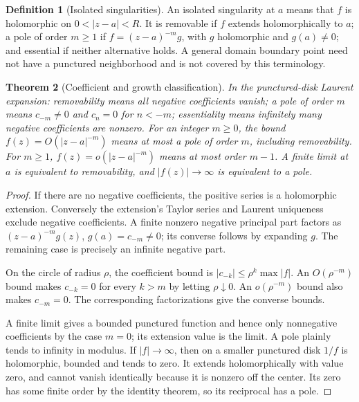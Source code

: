 \documentclass[11pt,a4paper,openany]{book}
\newtheorem{theorem}{Theorem}[chapter]
\theoremstyle{definition}
\newtheorem{definition}[theorem]{Definition}
\theoremstyle{remark}\newtheorem{remark}[theorem]{Remark}
\newcommand{\family}[1]{}
\begin{document}
\begin{definition}[Isolated singularities]\family{D12.07.02}\label{d12:07-02}
An isolated singularity at \(a\) means that \(f\) is holomorphic on
\(0<|z-a|<R\). It is removable if \(f\) extends holomorphically to \(a\);
a pole of order \(m\ge1\) if \(f=(z-a)^{-m}g\), with \(g\) holomorphic
and \(g(a)\ne0\); and essential if neither alternative holds.
A general domain boundary point need not have a punctured neighborhood
and is not covered by this terminology.
\end{definition}
\begin{theorem}[Coefficient and growth classification]\label{d12:07-02-classification}
In the punctured-disk Laurent expansion:
removability means all negative coefficients vanish;
a pole of order \(m\) means \(c_{-m}\ne0\) and \(c_n=0\) for \(n<-m\);
essentiality means infinitely many negative coefficients are nonzero.
For an integer \(m\ge0\), the bound \(f(z)=O(|z-a|^{-m})\) means at
most a pole of order \(m\), including removability.
For \(m\ge1\), \(f(z)=o(|z-a|^{-m})\) means at most order \(m-1\).
A finite limit at \(a\) is equivalent to removability, and
\(|f(z)|\to\infty\) is equivalent to a pole.
\end{theorem}
\begin{proof}
If there are no negative coefficients, the positive series is a
holomorphic extension. Conversely the extension's Taylor series and
Laurent uniqueness exclude negative coefficients.
A finite nonzero negative principal part factors as
\((z-a)^{-m}g(z)\), \(g(a)=c_{-m}\ne0\); its converse follows by
expanding \(g\). The remaining case is precisely an infinite negative
part.

On the circle of radius \(\rho\), the coefficient bound is
\(|c_{-k}|\le\rho^k\max|f|\).
An \(O(\rho^{-m})\) bound makes \(c_{-k}=0\) for every \(k>m\) by
letting \(\rho\downarrow0\). An \(o(\rho^{-m})\) bound also makes
\(c_{-m}=0\). The corresponding factorizations give the converse bounds.

A finite limit gives a bounded punctured function and hence only
nonnegative coefficients by the case \(m=0\); its extension value is
the limit. A pole plainly tends to infinity in modulus.
If \(|f|\to\infty\), then on a smaller punctured disk \(1/f\) is
holomorphic, bounded and tends to zero. It extends holomorphically
with value zero, and cannot vanish identically because it is nonzero
off the center. Its zero has some finite order by the identity theorem,
so its reciprocal has a pole.
\end{proof}
\end{document}
